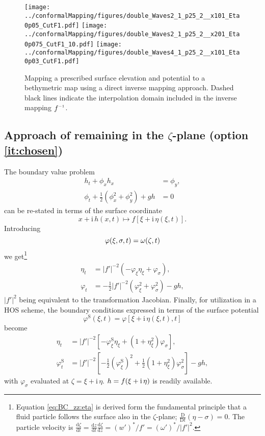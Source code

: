 \documentclass[internal]{sintefmemo}
\newcommand{\mr}{\mathrm}
\renewcommand{\S}{^\mr{S}}
\newcommand{\ii}{\mr{i}\,}
\renewcommand{\_}[1]{_\mr{#1}}
\let\Re\relax
\let\Im\relax
\DeclareMathOperator\Re{Re}
\DeclareMathOperator\Im{Im}
\newcommand{\w}{w}
\newcommand{\rbr}[1]{\left(#1\right)}
\newcommand{\sbr}[1]{\left[#1\right]}
\newcommand{\z}{z}
\newcommand{\x}{x}
\newcommand{\zz}{\zeta}
\newcommand{\xx}{\xi}
\newcommand{\yy}{\sigma}
\newcommand{\zmap}{f}
\newcommand{\zzmap}{\zmap^{\raisebox{.2ex}{$\scriptscriptstyle-1$}}}
\newcommand{\ww}{\omega}
\renewcommand{\w}{w}
\newcommand{\dd}[2]{\frac{\mr d #1}{\mr d #2}}
\begin{document}
\begin{figure}[h!ptb]%
\centering
{\texttt{[image: ../conformalMapping/figures/double\_nWaves2\_h1\_0p25\_h2\_1\_nx101\_aEta0p05\_kCutF1.pdf]}}%
{\texttt{[image: ../conformalMapping/figures/double\_nWaves2\_h1\_0p25\_h2\_1\_nx201\_aEta0p075\_kCutF1\_L10.pdf]}}
{\texttt{[image: ../conformalMapping/figures/double\_nWaves4\_h1\_0p25\_h2\_1\_nx101\_aEta0p03\_kCutF1.pdf]}}
\caption{Mapping a prescribed surface elevation and potential to a bethymetric map using a direct inverse mapping approach. Dashed black lines indicate the interpolation domain included in the inverse mapping $\zzmap$.}%
\label{fig:res:double2}%
\end{figure}


\subsection{Approach of remaining in the $\zz$-plane (option \ref{it:chosen})}
\label{sec:zz-planeApproach}
The boundary value problem 
\begin{align*}
h_t + \phi_x h_x&=\phi_y,\\
\phi_t + \frac12\rbr{\phi_x^2+\phi_y^2}+gh&=0
\end{align*}
can be re-stated in terms of the surface coordinate
\[
\x+\ii h(\x,t) \mapsto f[\xx+\ii \eta(\xx,t)].
\]
Introducing
\[\varphi(\xx,\yy,t)=\Re\ww(\zz,t) \]
we get\footnote{
Equation \eqref{eq:BC_zz:eta} is derived form the fundamental principle that a fluid particle follows the surface also in the $\zz$-plane; $\frac{\mr D}{\mr D t}(\eta-\yy)=0$. The particle velocity is 
$\dd\zz t = \dd\z t \dd\zz\z =(\w')^*/f'=(\ww')^*\big/|f'|^2$.
}
\begin{subequations}
\begin{align}
\eta_t &= |\zmap'|^{-2}  \rbr{ -  \varphi_\xx\eta_\xx  +  \varphi_\yy}, \label{eq:BC_zz:eta} \\
\varphi_t &=   - \frac12 |\zmap'|^{-2} \rbr{\varphi_\xx^2+\varphi_\yy^2}  - g h,
\end{align}%
\label{eq:BC_zz}%
\end{subequations}%
$|\zmap'|^{2}$ being equivalent to the transformation Jacobian. 
Finally, for utilization in a HOS scheme, the boundary conditions expressed in terms of the surface potential 
\[
\varphi\S(\xx,t)=\varphi[\xx+\ii\eta(\xx,t),t]
\]
become
\begin{subequations}
\begin{align}
\eta_t &= |\zmap'|^{-2} \sbr{-   \varphi\S_\xx\eta_\xx + \rbr{1+\eta_\xx^2} \varphi_\yy},\\
\varphi\S_t  &= |\zmap'|^{-2}\sbr{ - \frac12  \rbr{\varphi\S_\xx}^2 + \frac12 \rbr{1+\eta_\xx^2} \varphi_\yy^2 }  - g h,
\end{align}%
\end{subequations}%
with  $\varphi_\yy$ evaluated at $\zz=\xx+\ii\eta$.
$h=\Im \zmap(\xx+\ii\eta)$ is readily available. 
\end{document}
